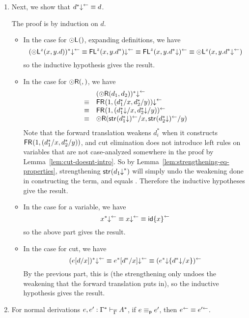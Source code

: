 \begin{enumerate}
\item Next, we show that ${d^*\mathord{\downarrow}}^{\leftarrow} \equiv d$.

The proof is by induction on $d$.  

\begin{itemize}
\item In the case for $\mathord{\odot}\mathsf{L}^{}()$, expanding definitions, we have
\[
(\mathord{\odot}\mathsf{L}^{z}(x,y.d))^*\mathord{\downarrow}^{\leftarrow} \equiv
\mathsf{FL}^{z}(x,y.d^*)\mathord{\downarrow}^{\leftarrow} \equiv 
\mathsf{FL}^{z}(x,y.d^*\mathord{\downarrow})^{\leftarrow} \equiv
{\ensuremath{\mathord{\odot}}\ensuremath{\mathsf{L}}^{z}(x,y.\ensuremath{d^*\mathord{\downarrow}^{\leftarrow}})}
\]
so the inductive hypothesis gives the result.  

\item In the case for $\mathord{\odot}\mathsf{R}(,)$, we have
\[
\begin{array}{ll}
& (\mathord{\odot}\mathsf{R}(d_1,d_2))^*\mathord{\downarrow}^{\leftarrow} \\
\equiv & \mathsf{FR}_{}(1,(d_1^*/x,d_2^*/y))\mathord{\downarrow}^{\leftarrow} \\
\equiv & \mathsf{FR}_{}(1,(d_1^*\mathord{\downarrow}/x,d_2^*\mathord{\downarrow}/y))^{\leftarrow} \\
\equiv & \mathord{\odot}\mathsf{R}(\mathsf{str}_{}(d_1^*\mathord{\downarrow})^{\leftarrow}/x,\mathsf{str}_{}(d_2^*\mathord{\downarrow})^{\leftarrow}/y)
\end{array}
\]
Note that the forward translation weakens $d_i^*$ when it constructs 
${\mathsf{FR}_{}(1,(d_1^*/x,d_2^*/y))}$, and cut elimination does not introduce
left rules on variables that are not case-analyzed somewhere in the
proof by Lemma~\ref{lem:cut-doesnt-intro}.  
So by Lemma~\ref{lem:strengthening-eq-properties}, strengthening
$\mathsf{str}_{}(d_1\mathord{\downarrow}^*)$ will simply undo the weakening done in
constructing the term, and  equals
.  Therefore the inductive hypotheses give the
result.

\item In the case for a variable, we have
\[
x^*\mathord{\downarrow}^{\leftarrow} \equiv x\mathord{\downarrow}^{\leftarrow} \equiv {\ensuremath{\mathsf{id}}\{x\}}^{\leftarrow}
\]
so the above part gives the result.  

\item In the case for cut, we have
\[
(e[d/x])^*\mathord{\downarrow}^{\leftarrow} \equiv e^*[d^*/x]\mathord{\downarrow}^{\leftarrow}
\equiv (e^*\mathord{\downarrow}\{d^*\mathord{\downarrow}/x\})^{\leftarrow}
\]
By the previous part, this is
 (the strengthening
only undoes the weakening that the forward translation puts in), so the
inductive hypothesis gives the result.
\end{itemize}

\item For normal derivations $e,e' :
  \Gamma^* \vdash_{\overline{\Gamma}} A^*$, if $e \equiv_{\mathsf{p}} e'$, then
  $e^{\leftarrow} \equiv e'^{\leftarrow}$.


\end{enumerate}
